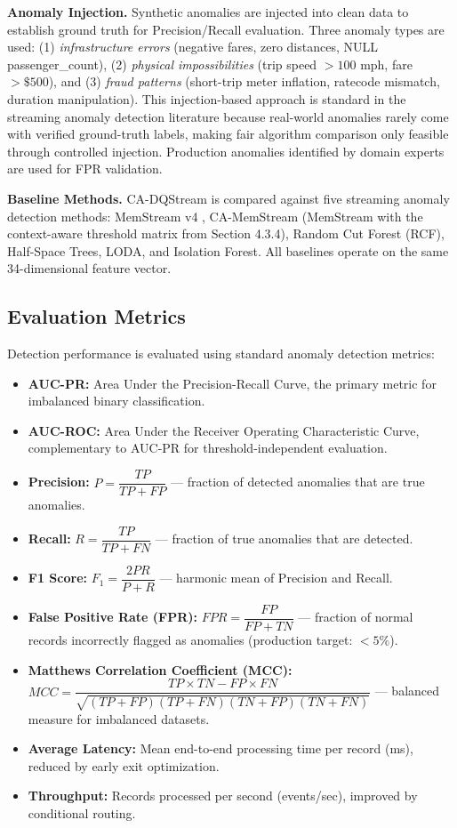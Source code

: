 \textbf{Anomaly Injection.} Synthetic anomalies are injected into clean data to establish ground truth for Precision/Recall evaluation. Three anomaly types are used: (1) \textit{infrastructure errors} (negative fares, zero distances, NULL passenger\_count), (2) \textit{physical impossibilities} (trip speed $> 100$ mph, fare $> \$500$), and (3) \textit{fraud patterns} (short-trip meter inflation, ratecode mismatch, duration manipulation). This injection-based approach is standard in the streaming anomaly detection literature \citep{DCRepair2022,icewafl2025,dafdiscover2024} because real-world anomalies rarely come with verified ground-truth labels, making fair algorithm comparison only feasible through controlled injection. Production anomalies identified by domain experts are used for FPR validation.

\textbf{Baseline Methods.} CA-DQStream is compared against five streaming anomaly detection methods: MemStream v4 \citep{bhatia2022memstream}, CA-MemStream (MemStream with the context-aware threshold matrix from Section 4.3.4), Random Cut Forest (RCF), Half-Space Trees, LODA, and Isolation Forest. All baselines operate on the same 34-dimensional feature vector.

\subsection{Evaluation Metrics}
\label{sec:metrics}

Detection performance is evaluated using standard anomaly detection metrics:

\begin{itemize}
    \item \textbf{AUC-PR:} Area Under the Precision-Recall Curve, the primary metric for imbalanced binary classification.
    \item \textbf{AUC-ROC:} Area Under the Receiver Operating Characteristic Curve, complementary to AUC-PR for threshold-independent evaluation.
    \item \textbf{Precision:} $P = \dfrac{TP}{TP + FP}$ --- fraction of detected anomalies that are true anomalies.
    \item \textbf{Recall:} $R = \dfrac{TP}{TP + FN}$ --- fraction of true anomalies that are detected.
    \item \textbf{F1 Score:} $F_1 = \dfrac{2PR}{P + R}$ --- harmonic mean of Precision and Recall.
    \item \textbf{False Positive Rate (FPR):} $FPR = \dfrac{FP}{FP + TN}$ --- fraction of normal records incorrectly flagged as anomalies (production target: $<5\%$).
    \item \textbf{Matthews Correlation Coefficient (MCC):} $MCC = \dfrac{TP \times TN - FP \times FN}{\sqrt{(TP+FP)(TP+FN)(TN+FP)(TN+FN)}}$ --- balanced measure for imbalanced datasets.
    \item \textbf{Average Latency:} Mean end-to-end processing time per record (ms), reduced by early exit optimization.
    \item \textbf{Throughput:} Records processed per second (events/sec), improved by conditional routing.
\end{itemize}

